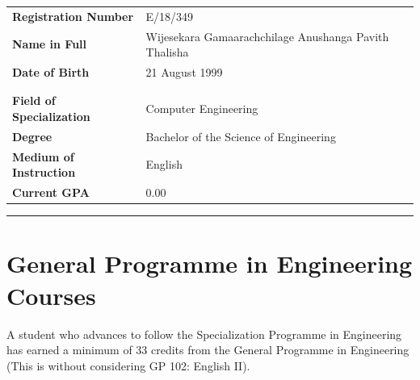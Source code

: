 \documentclass[12pt]{article}
\begin{document}
\begin{table}[H]
\begin{tabularx}{\textwidth}{Xl}
\textbf{Registration Number} & E/18/349 \\
\textbf{Name in Full} & Wijesekara Gamaarachchilage Anushanga Pavith Thalisha \\
\textbf{Date of Birth} & 21 August 1999 \\
\\
\\

\textbf{Field of Specialization} & Computer Engineering \\
\textbf{Degree} & Bachelor of the Science of Engineering \\
\textbf{Medium of Instruction} & English \\
\textbf{Current GPA} & 0.00 \\
\end{tabularx}
\end{table}

\vspace{-15pt}

\noindent\rule{\textwidth}{1pt}

\vspace{-20pt}

\section*{General Programme in Engineering Courses}

A student who advances to follow the Specialization Programme in Engineering has earned a minimum of 33 credits from the General Programme in Engineering (This is without considering GP 102: English II).
\end{document}
